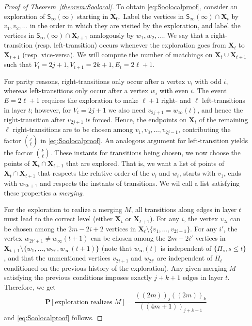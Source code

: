 \documentclass[a4paper,11pt,reqno]{amsart}
\newcommand{\bP}{\mathbf{P}}
\newcommand{\Soo}{\mathsf{S}_\infty}
\newcommand{\fdf}[1]{(\!(#1)\!)}
\theoremstyle{definition}
\begin{document}
\begin{proof}[Proof of Theorem~\ref{theorem:Soolocal}]
 To obtain \eqref{eq:Soolocalproof}, consider an exploration of $\Soo(\infty)$ starting in $\mathbf{X}_0$. Label the vertices in $\Soo(\infty)\cap \mathbf{X}_t$ by $v_1,v_2,\dots$ in the order in which they are visited by the exploration, and label the vertices in $\Soo(\infty)\cap \mathbf{X}_{t+1}$ analogously by $w_1,w_2,\dots$. We say that a right-transition (resp. left-transition) occurs whenever the exploration goes from $\mathbf{X}_t$ to $\mathbf{X}_{t+1}$ (resp. vice-versa). We will compute the number of matchings on $\mathbf{X}_t \cup \mathbf{X}_{t+1}$ such that $V_t=2j+1, V_{t+1}=2k+1, E_t=2\ell+1$.
 
 For parity reasons, right-transitions only occur after a vertex $v_i$ with odd $i$, whereas left-transitions only occur after a vertex $w_i$ with even $i$. The event $E=2\ell+1$ requires the exploration to make $\ell+1$ right- and $\ell$ left-transitions in layer $t$; however, for $V_t=2j+1$ we also need $v_{2j+1}=w_\infty(t)$, and hence the right-transition after $v_{2j+1}$ is forced. Hence, the endpoints on $\mathbf{X}_t$ of the remaining $\ell$ right-transitions are to be chosen among $v_1, v_3, \ldots, v_{2j-1}$, contributing the factor $\binom{j}{\ell}$ in \eqref{eq:Soolocalproof}. An analogous argument for left-transition yields the factor $\binom{k}{\ell}$.
 These instants for transitions being chosen, we now choose the points of $\mathbf{X}_{t} \cap \mathbf{X}_{t+1}$ that are explored. That is, we want a list of points of $\mathbf{X}_{t} \cap \mathbf{X}_{t+1}$ that respects the relative order of the $v_i$ and $w_i$, starts with $v_1$, ends with $w_{2k+1}$ and respects the instants of transitions. We wil call a list satisfying these properties a \emph{merging}.
 
 For the exploration to realize a merging $M$, all transitions along edges in layer $t$ must lead to the correct level (either $\mathbf{X}_t$ or $\mathbf{X}_{t+1}$). For any $i$, the vertex $v_{2i}$ can be chosen among the $2m-2i+2$ vertices in $\mathbf{X}_t\setminus\{v_1,\dots,v_{2i-1}\}$. For any $i'$, the vertex $w_{2i'+1}\neq w_\infty(t+1)$ can be chosen among the $2m-2i'$ vertices in $\mathbf{X}_{t+1}\setminus\{w_1,\dots,w_{2i'},w_\infty(t+1)\}$ (note that $w_\infty(t)$ is independent of $\{\Pi_s, s\leq t\}$, and that the unmentioned vertices $v_{2i+1}$ and $w_{2i'}$ are independent of $\Pi_t$ conditioned on the previous history of the exploration). Any given merging $M$ satisfying the previous conditions imposes exactly $j+k+1$ edges in layer $t$. Therefore, we get
 \[
  \bP[\text{exploration realizes $M$}] = \frac{\fdf{2m}_j \fdf{2m}_k}{\fdf{4m+1}_{j+k+1}}
 \]
 and \eqref{eq:Soolocalproof} follows. 
 

\end{proof}
\end{document}
